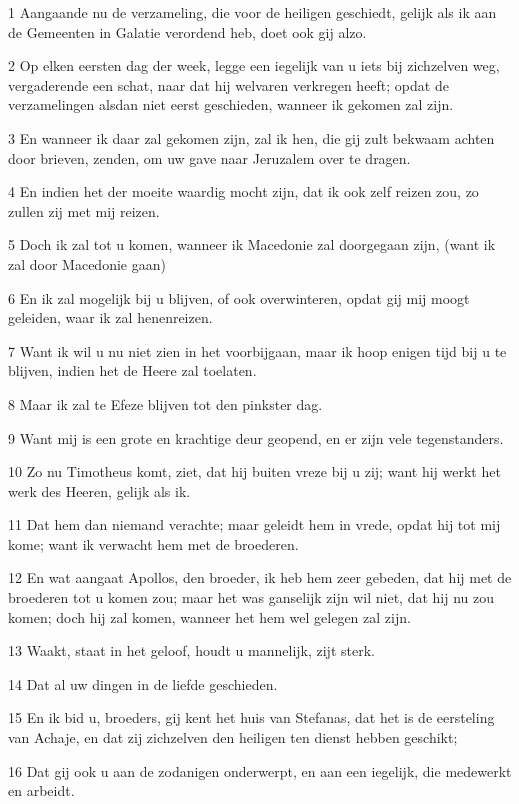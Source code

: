 \par 1 Aangaande nu de verzameling, die voor de heiligen geschiedt, gelijk als ik aan de Gemeenten in Galatie verordend heb, doet ook gij alzo.
\par 2 Op elken eersten dag der week, legge een iegelijk van u iets bij zichzelven weg, vergaderende een schat, naar dat hij welvaren verkregen heeft; opdat de verzamelingen alsdan niet eerst geschieden, wanneer ik gekomen zal zijn.
\par 3 En wanneer ik daar zal gekomen zijn, zal ik hen, die gij zult bekwaam achten door brieven, zenden, om uw gave naar Jeruzalem over te dragen.
\par 4 En indien het der moeite waardig mocht zijn, dat ik ook zelf reizen zou, zo zullen zij met mij reizen.
\par 5 Doch ik zal tot u komen, wanneer ik Macedonie zal doorgegaan zijn, (want ik zal door Macedonie gaan)
\par 6 En ik zal mogelijk bij u blijven, of ook overwinteren, opdat gij mij moogt geleiden, waar ik zal henenreizen.
\par 7 Want ik wil u nu niet zien in het voorbijgaan, maar ik hoop enigen tijd bij u te blijven, indien het de Heere zal toelaten.
\par 8 Maar ik zal te Efeze blijven tot den pinkster dag.
\par 9 Want mij is een grote en krachtige deur geopend, en er zijn vele tegenstanders.
\par 10 Zo nu Timotheus komt, ziet, dat hij buiten vreze bij u zij; want hij werkt het werk des Heeren, gelijk als ik.
\par 11 Dat hem dan niemand verachte; maar geleidt hem in vrede, opdat hij tot mij kome; want ik verwacht hem met de broederen.
\par 12 En wat aangaat Apollos, den broeder, ik heb hem zeer gebeden, dat hij met de broederen tot u komen zou; maar het was ganselijk zijn wil niet, dat hij nu zou komen; doch hij zal komen, wanneer het hem wel gelegen zal zijn.
\par 13 Waakt, staat in het geloof, houdt u mannelijk, zijt sterk.
\par 14 Dat al uw dingen in de liefde geschieden.
\par 15 En ik bid u, broeders, gij kent het huis van Stefanas, dat het is de eersteling van Achaje, en dat zij zichzelven den heiligen ten dienst hebben geschikt;
\par 16 Dat gij ook u aan de zodanigen onderwerpt, en aan een iegelijk, die medewerkt en arbeidt.
